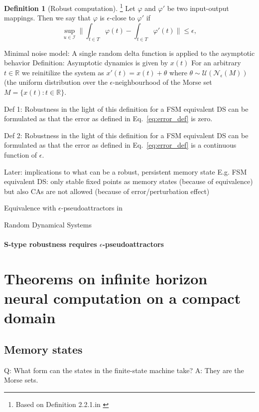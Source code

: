 \documentclass{scrartcl}
\theoremstyle{definition}
\newtheorem{definition}{Definition}
\theoremstyle{remark}
\newcommand{\reals}{\mathbb{R}}
\begin{document}
\begin{definition}[Robust computation]\footnote{Based on Definition 2.2.1.in \citep{kuehn2015}}
 Let $\varphi$ and $\varphi'$ be two input-output mappings.
  Then we say that $\varphi$ is $\epsilon$-close to $\varphi'$ if
\begin{equation}\label{eq:error_def}
\sup_{u\in \mathcal{I}}\|\int_{t\in T}\varphi(t) - \int_{t\in T}\varphi'(t)\|  \leq \epsilon,
\end{equation}
\end{definition}


Minimal noise model: 
A single random delta function is applied to the asymptotic behavior
Definition:
Asymptotic dynamics is given by $x(t)$
For an arbitrary $t \in \reals$ we reinitilize the system as $x'(t)=x(t) + \theta$ where $\theta\sim \mathcal{U}(\mathcal{N}_\epsilon(M))$ (the uniform distribution over the $\epsilon$-neighbourhood of the Morse set $M=\{x(t)\colon t\in \reals\}$.

Def 1: Robustness in the light of this definition for a FSM equivalent DS can be formulated as that the error as defined in Eq.~\ref{eq:error_def} is zero.

Def 2: Robustness in the light of this definition for a FSM equivalent DS can be formulated as that the error as defined in Eq.~\ref{eq:error_def} is a continuous function of $\epsilon$.

Later: implications to what can be a robust, persistent memory state
E.g.  FSM equivalent DS: only stable fixed points as memory states (because of equivalence)
but also CAs are not allowed (because of error/perturbation effect)


Equivalence with $\epsilon$-pseudoattractors in \citep{casey1996}


Random Dynamical Systems
\citep{homburg2013bifurcations}


\paragraph{S-type robustness requires $\epsilon$-pseudoattractors}



\section{Theorems on infinite horizon neural computation on a compact domain}\label{sec:theorems}


\subsection{Memory states}%
Q: What form can the states in the finite-state machine take?
A: They are the Morse sets.
\end{document}
